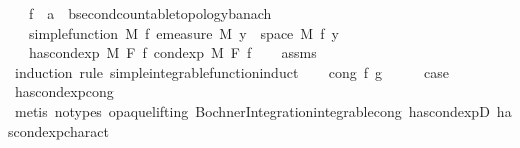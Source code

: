 \begin{isabellebody}
\ \ \ f\ {\isacharcolon}{\kern0pt}{\isacharcolon}{\kern0pt}\ {\isachardoublequoteopen}{\isacharprime}{\kern0pt}a\ {\isasymRightarrow}\ {\isacharprime}{\kern0pt}b{\isacharcolon}{\kern0pt}{\isacharcolon}{\kern0pt}{\isacharbraceleft}{\kern0pt}second{\isacharunderscore}{\kern0pt}countable{\isacharunderscore}{\kern0pt}topology{\isacharcomma}{\kern0pt}banach{\isacharbraceright}{\kern0pt}{\isachardoublequoteclose}\isanewline
\ \ \ {\isachardoublequoteopen}simple{\isacharunderscore}{\kern0pt}function\ M\ f{\isachardoublequoteclose}\ {\isachardoublequoteopen}emeasure\ M\ {\isacharbraceleft}{\kern0pt}y\ {\isasymin}\ space\ M{\isachardot}{\kern0pt}\ f\ y\ {\isasymnoteq}\ {}{\isacharbraceright}{\kern0pt}\ {\isasymnoteq}\ {\isasyminfinity}{\isachardoublequoteclose}\isanewline
\ \ \ {\isachardoublequoteopen}has{\isacharunderscore}{\kern0pt}cond{\isacharunderscore}{\kern0pt}exp\ M\ F\ f\ {\isacharparenleft}{\kern0pt}cond{\isacharunderscore}{\kern0pt}exp\ M\ F\ f{\isacharparenright}{\kern0pt}{\isachardoublequoteclose}\isanewline
%
\isadelimproof
\ \ %
\endisadelimproof
%
\isatagproof
{}\isamarkupfalse%
\ assms\isanewline
{}\isamarkupfalse%
\ {\isacharparenleft}{\kern0pt}induction\ rule{\isacharcolon}{\kern0pt}\ simple{\isacharunderscore}{\kern0pt}integrable{\isacharunderscore}{\kern0pt}function{\isacharunderscore}{\kern0pt}induct{\isacharparenright}{\kern0pt}\isanewline
\ \ \isamarkupfalse%
\ {\isacharparenleft}{\kern0pt}cong\ f\ g{\isacharparenright}{\kern0pt}\isanewline
\ \ \isamarkupfalse%
\ \isamarkupfalse%
\ {\isacharquery}{\kern0pt}case\ \isamarkupfalse%
\ has{\isacharunderscore}{\kern0pt}cond{\isacharunderscore}{\kern0pt}exp{\isacharunderscore}{\kern0pt}cong\ \isamarkupfalse%
\ {\isacharparenleft}{\kern0pt}metis\ {\isacharparenleft}{\kern0pt}no{\isacharunderscore}{\kern0pt}types{\isacharcomma}{\kern0pt}\ opaque{\isacharunderscore}{\kern0pt}lifting{\isacharparenright}{\kern0pt}\ Bochner{\isacharunderscore}{\kern0pt}Integration{\isachardot}{\kern0pt}integrable{\isacharunderscore}{\kern0pt}cong\ has{\isacharunderscore}{\kern0pt}cond{\isacharunderscore}{\kern0pt}expD{\isacharparenleft}{\kern0pt}{}{\isacharparenright}{\kern0pt}\ has{\isacharunderscore}{\kern0pt}cond{\isacharunderscore}{\kern0pt}exp{\isacharunderscore}{\kern0pt}charact{\isacharparenleft}{\kern0pt}{}{\isacharparenright}{\kern0pt}{\isacharparenright}{\kern0pt}\isanewline
{}\isamarkupfalse%

\end{isabellebody}
